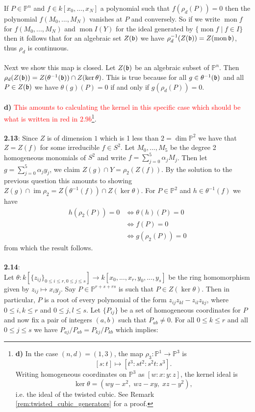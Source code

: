 \documentclass[12pt]{article}
\numberwithin{thm}{subsection}
\numberwithin{defn}{subsection}
\numberwithin{lemma}{subsection}
\numberwithin{example}{subsection}
\numberwithin{notation}{subsection}
\numberwithin{cor}{subsection}
\numberwithin{remark}{subsection}
\numberwithin{condition}{subsection}
\numberwithin{question}{subsection}
\numberwithin{construction}{subsection}
\numberwithin{construction}{subsection}
\numberwithin{construction}{subsection}
\newcommand{\bb}[1]{\mathbb{#1}}
\newcommand{\lto}{\longrightarrow}
\begin{document}
%
If $P \in \bb{P}^n$ and $f \in k[x_0,...,x_N]$ a polynomial such that $f(\rho_d(P)) = 0$ then the polynomial $f(M_0,...,M_N)$ vanishes at $P$ and conversely. So if we write $\operatorname{mon}f$ for $f(M_0,...,M_N)$ and $\operatorname{mon}I(Y)$ for the ideal generated by $\lbrace \operatorname{mon}f \mid f \in I \rbrace$ then it follows that for an algebraic set $Z(\frak{b})$ we have $\rho_d^{-1}(Z(\frak{b})) = Z(\operatorname{mon}\frak{b})$, thus $\rho_d$ is continuous.\\\\
%
Next we show this map is closed. Let $Z(\frak{b})$ be an algebraic subset of $\bb{P}^n$. Then $\rho_d(Z(\frak{b})) = Z(\theta^{-1}(\frak{b})) \cap Z(\ker \theta)$. This is true because for all $g \in \theta^{-1}(\frak{b})$ and all $P \in Z(\frak{b})$ we have $\theta(g)(P) = 0$ if and only if $g(\rho_d(P)) = 0$.\\\\
%
\textbf{d)} \textcolor{red}{This amounts to calculating the kernel in this specific case which should be what is written in red in $2.9b$}\footnote{\textbf{d)} In the case $(n,d)=(1,3)$, the map $\rho_3:\bb{P}^1\to\bb{P}^3$ is
\[
[s:t]\longmapsto [t^3:st^2:s^2t:s^3].
\]
Writing homogeneous coordinates on $\bb{P}^3$ as $[w:x:y:z]$, the kernel ideal is
\[
\ker\theta = (wy-x^2,\; wz-xy,\; xz-y^2),
\]
i.e. the ideal of the twisted cubic. See Remark \ref{rem:twisted_cubic_generators} for a proof.}.\\\\
%
\textbf{2.13}: Since $Z$ is of dimension $1$ which is 1 less than $2 = \operatorname{dim}\bb{P}^2$ we have that $Z = Z(f)$ for some irreducible $f \in S^2$. Let $M_0,...,M_5$ be the degree 2 homogeneous monomials of $S^2$ and write $f = \sum_{j = 0}^5 \alpha_j M_j$. Then let $g = \sum_{j=0}^5\alpha_j y_j$, we claim $Z(g) \cap Y = \rho_2(Z(f))$. By the solution to the previous question this amounts to showing $Z(g) \cap \operatorname{im}\rho_2 = Z(\theta^{-1}(f)) \cap Z(\ker\theta)$. For $P \in \bb{P}^2$ and $h \in \theta^{-1}(f)$ we have
\begin{align*}
h(\rho_2(P)) = 0 &\Longleftrightarrow \theta(h)(P) = 0\\
& \Longleftrightarrow f(P) = 0\\
&\Longleftrightarrow g(\rho_2(P)) = 0
\end{align*}
from which the result follows.\\\\
%
\textbf{2.14}:\\
Let $\theta: k[\lbrace z_{ij}\rbrace_{0\leq i \leq r,0\leq j \leq s}] \lto k[x_0,...,x_r,y_0,...,y_s]$ be the ring homomorphism given by $z_{ij} \mapsto x_iy_j$. Say $P \in \bb{P}^{r + s + rs}$ is such that $P \in Z(\ker \theta)$. Then in particular, $P$ is a root of every polynomial of the form $z_{ij}z_{kl} - z_{il}z_{kj}$, where $0\leq i,k\leq r$ and $0\leq j,l\leq s$. Let $\lbrace P_{ij}\rbrace$ be a set of homogeneous coordinates for $P$ and now fix a pair of integers $(a,b)$ such that $P_{ab} \neq 0$. For all $0 \leq k\leq r$ and all $0 \leq j \leq s$ we have $P_{aj}/P_{ab} = P_{kj}/P_{kb}$ which implies:
\end{document}
